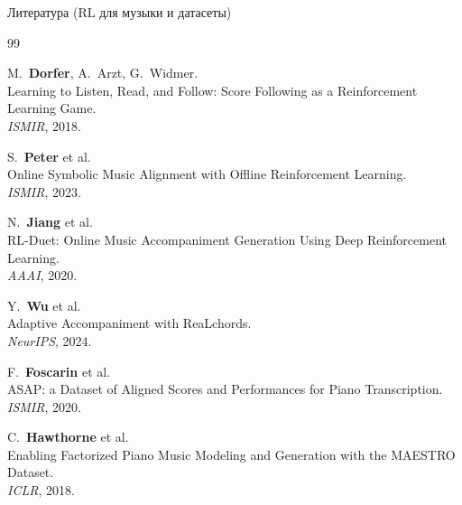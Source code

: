 \begin{frame}{Литература (RL для музыки и датасеты)}

\footnotesize
\begin{thebibliography}{99}

  M.~\textbf{Dorfer}, A.~Arzt, G.~Widmer.\\
  Learning to Listen, Read, and Follow: Score Following as a
  Reinforcement Learning Game.\\
  \emph{ISMIR}, 2018.

  S.~\textbf{Peter} et al.\\
  Online Symbolic Music Alignment with Offline Reinforcement Learning.\\
  \emph{ISMIR}, 2023.

  N.~\textbf{Jiang} et al.\\
  RL-Duet: Online Music Accompaniment Generation Using Deep
  Reinforcement Learning.\\
  \emph{AAAI}, 2020.

  Y.~\textbf{Wu} et al.\\
  Adaptive Accompaniment with ReaLchords.\\
  \emph{NeurIPS}, 2024.

  F.~\textbf{Foscarin} et al.\\
  ASAP: a Dataset of Aligned Scores and Performances for Piano
  Transcription.\\
  \emph{ISMIR}, 2020.

  C.~\textbf{Hawthorne} et al.\\
  Enabling Factorized Piano Music Modeling and Generation with the
  MAESTRO Dataset.\\
  \emph{ICLR}, 2018.

\end{thebibliography}

\end{frame}
